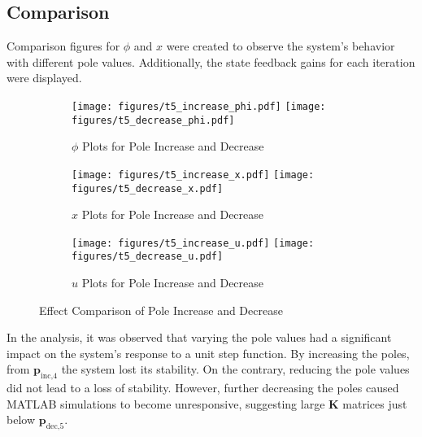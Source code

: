\documentclass[12pt]{article}
\begin{document}
\subsection*{Comparison}
\noindent Comparison figures for $\phi$ and $x$ were created to observe the system's behavior with different pole values. Additionally, the state feedback gains for each iteration were displayed.

\begin{figure}[htbp]
  \centering

  \begin{minipage}{\textwidth}
    \begin{subfigure}{\textwidth}
      \texttt{[image: figures/t5\_increase\_phi.pdf]}
      \hfill
      \texttt{[image: figures/t5\_decrease\_phi.pdf]}
      \caption{$\phi$ Plots for Pole Increase and Decrease}
    \end{subfigure}

    \medskip

    \begin{subfigure}{\textwidth}
      \texttt{[image: figures/t5\_increase\_x.pdf]}
      \hfill
      \texttt{[image: figures/t5\_decrease\_x.pdf]}
      \caption{$x$ Plots for Pole Increase and Decrease}
    \end{subfigure}

    \medskip

    \begin{subfigure}{\textwidth}
      \texttt{[image: figures/t5\_increase\_u.pdf]}
      \hfill
      \texttt{[image: figures/t5\_decrease\_u.pdf]}
      \caption{$u$ Plots for Pole Increase and Decrease}
    \end{subfigure}
    \caption{Effect Comparison of Pole Increase and Decrease}
    \label{fig:t5_plots}
  \end{minipage}
 
\end{figure}

\noindent In the analysis, it was observed that varying the pole values had a significant impact on the system's response to a unit step function. By increasing the poles, from $\mathbf{p}_{\text{inc,4}}$ the system lost its stability. On the contrary, reducing the pole values did not lead to a loss of stability. However, further decreasing the poles caused MATLAB simulations to become unresponsive, suggesting large $\mathbf{K}$ matrices just below $\mathbf{p}_{\text{dec,5}}$.
\medskip
\end{document}
